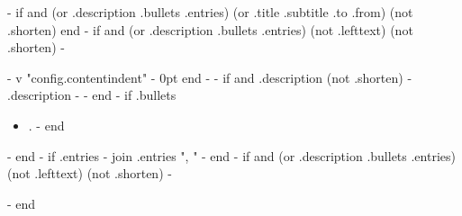 {{- if and (or .description .bullets .entries) (or .title .subtitle .to .from) (not .shorten) }}
	\vfill\break
{{ end -}}
{{ if and (or .description .bullets .entries) (not .lefttext) (not .shorten) -}}
\begin{minipage}{\linewidth}
\begin{adjustwidth}{ {{- v "config.contentindent" -}} }{0pt}
{{ end -}}
{{- if and .description (not .shorten) -}}
	{{ .description -}}
{{- end -}}
{{ if .bullets }}
\begin{minipage}{\linewidth}
	\begin{itemize}
		{{- range .bullets }}
			\item {{ . -}}
		{{ end }}
	\end{itemize}
\end{minipage}
{{- end -}}
{{ if .entries -}}
	{{ join .entries ", " }}
{{- end -}}
{{ if and (or .description .bullets .entries) (not .lefttext) (not .shorten) -}}
\end{adjustwidth}
\end{minipage}
{{- end }}